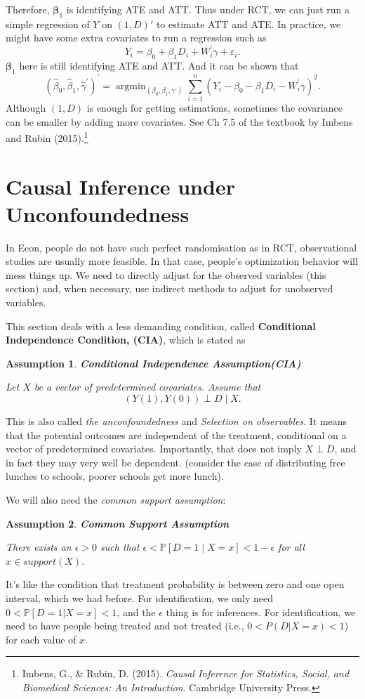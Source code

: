 \documentclass[11pt,a4paper]{amsart}
\theoremstyle{plain}
\newtheorem{assumption}{Assumption}
\theoremstyle{definition}
\begin{document}
	Therefore, $\boldsymbol{\beta}_{1}$ is identifying ATE and ATT. Thus under RCT, we can just run a simple regression of $Y$ on $(1,D)'$ to estimate ATT and ATE. In practice, we might have some extra covariates to run a regression such as
	\[	Y_{i}=\beta_{0}+\beta_{1} D_{i}+W_{i}^{\prime} \gamma+\varepsilon_{i}.	\]
	$\boldsymbol{\beta}_{1}$ here is still identifying ATE and ATT. And it can be shown that
	\[	\left(\widehat{\beta}_{0}, \widehat{\beta}_{1}, \widehat{\gamma}^{\prime}\right)^{\prime}=\operatorname{argmin}_{\left(\beta_{0}, \beta_{1}, \gamma^{\prime}\right)} \sum_{i=1}^{n}\left(Y_{i}-\beta_{0}-\beta_{1} D_{i}-W_{i}^{\prime} \gamma\right)^{2}.	\]
	Although $(1,D)$ is enough for getting estimations, sometimes the covariance can be smaller by adding more covariates. See Ch 7.5 of the textbook by Imbens and Rubin (2015).\footnote{Imbens, G., \& Rubin, D. (2015). \textit{Causal Inference for Statistics, Social, and Biomedical Sciences: An Introduction}. Cambridge University Press.} 

\section{Causal Inference under Unconfoundedness}
	In Econ, people do not have such perfect randomisation as in RCT, observational studies are usually more feasible. In that case, people's optimization behavior will mess things up. We need to directly adjust for the observed variables (this section) and, when necessary, use indirect methods to adjust for unobserved variables. \par 
	This section deals with a less demanding condition, called \textbf{Conditional Independence Condition, (CIA)}, which is stated as 
	\begin{assumption}
		\textbf{Conditional Independence Assumption(CIA)}\par 
		Let $X$ be a vector of predetermined covariates. Assume that 
		\[	(Y(1),Y(0)) \perp D \mid  X.	\]
	\end{assumption}
	This is also called \textit{the unconfoundedness} and \textit{Selection on observables}. It means that the potential outcomes are independent of the treatment, conditional on a vector of predetermined covariates. Importantly, that does not imply $X \perp D$, and in fact they may very well be dependent. (consider the case of distributing free lunches to schools, poorer schools get more lunch). \par
	We will also need the \textit{common support assumption}:
	\begin{assumption}
		\textbf{Common Support Assumption} \par 
		There exists an $\epsilon > 0$ such that $\epsilon < \mathbb{P}[D=1 \mid X=x] < 1-\epsilon$ for all $x \in support(X)$. 
	\end{assumption} 
	It's like the condition that treatment probability is between zero and one open interval, which we had before. For identification, we only need $0 < \mathbb{P}[D=1|X=x]  < 1$, and the $\epsilon$ thing is for inferences. For identification, we need to have people being treated and not treated (i.e., $0 < P(D|X = x) < 1$) for each value of $x$. 
	
\end{document}
